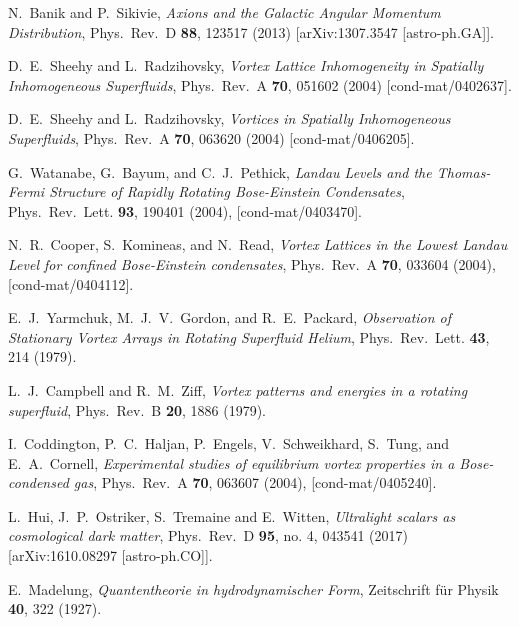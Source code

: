 \documentclass[aps,prd,twocolumn,nofootinbib,superscriptaddress]{revtex4-1}
\begin{document}
\begin{thebibliography}{99}
  N.~Banik and P.~Sikivie,
  \emph{Axions and the Galactic Angular Momentum Distribution},
  Phys.\ Rev.\ D {\bf 88}, 123517 (2013)
  [arXiv:1307.3547 [astro-ph.GA]].
  

  D.~E.~Sheehy and L.~Radzihovsky,
  \emph{Vortex Lattice Inhomogeneity in Spatially Inhomogeneous Superfluids},
  Phys.\ Rev.\ A {\bf 70}, 051602 (2004)
  [cond-mat/0402637].

  D.~E.~Sheehy and L.~Radzihovsky,
  \emph{Vortices in Spatially Inhomogeneous Superfluids},
  Phys.\ Rev.\ A {\bf 70}, 063620 (2004)
  [cond-mat/0406205].
  
  G.~Watanabe, G.~Bayum, and C.~J.~Pethick,
  \emph{Landau Levels and the Thomas-Fermi Structure of Rapidly Rotating Bose-Einstein Condensates},
  Phys.\ Rev.\ Lett. {\bf 93}, 190401 (2004),
  [cond-mat/0403470].
  
  N.~R.~Cooper, S.~Komineas, and N.~Read,
  \emph{Vortex Lattices in the Lowest Landau Level for confined Bose-Einstein condensates},
  Phys.\ Rev.\ A {\bf 70}, 033604 (2004),
  [cond-mat/0404112].
  
  E.~J.~Yarmchuk, M.~J.~V.~Gordon, and R.~E.~Packard,
  \emph{Observation of Stationary Vortex Arrays in Rotating Superfluid Helium},
  Phys.\ Rev.\ Lett. {\bf 43}, 214 (1979).
  
  L.~J.~Campbell and R.~M.~Ziff,
  \emph{Vortex patterns and energies in a rotating superfluid},
  Phys.\ Rev.\ B {\bf 20}, 1886 (1979).
  
  I.~Coddington, P.~C.~Haljan, P.~Engels, V.~Schweikhard, S.~Tung, and E.~A.~Cornell,
  \emph{Experimental studies of equilibrium vortex properties in a Bose-condensed gas},
  Phys.\ Rev.\ A {\bf 70}, 063607 (2004),
  [cond-mat/0405240].
  
  

  L.~Hui, J.~P.~Ostriker, S.~Tremaine and E.~Witten,
  \emph{Ultralight scalars as cosmological dark matter},
  Phys.\ Rev.\ D {\bf 95}, no. 4, 043541 (2017)
  [arXiv:1610.08297 [astro-ph.CO]].
  
	E.~Madelung,
	\emph{Quantentheorie in hydrodynamischer Form},
	Zeitschrift f\"ur Physik {\bf 40}, 322 (1927).


\end{thebibliography}
\end{document}
